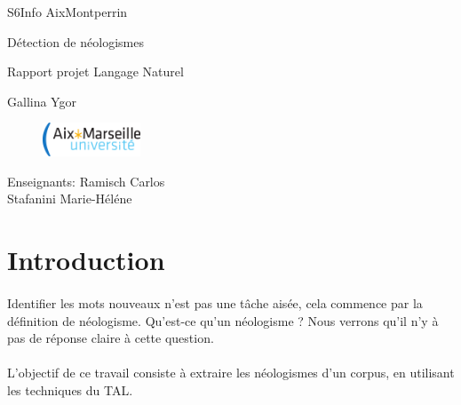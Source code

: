 \documentclass{article}
\begin{document}
\begin{flushleft}
S6Info AixMontperrin 
\end{flushleft}
\vspace*{150pt}
\begin{center}
{\Huge Détection de néologismes\par}
{\LARGE Rapport projet Langage Naturel\par\vspace*{20pt}}
{\Large Gallina Ygor\par\vspace*{20pt}}

\vspace{170pt}

\end{center}
\begin{figure}[htbp]
\begin{flushleft}
\includegraphics[height=1cm]{logo.eps}
\end{flushleft}
\end{figure}

\vspace*{-50pt}
\begin{flushright}
Enseignants: Ramisch Carlos\\Stafanini Marie-Héléne
\end{flushright}

\newpage

\section{Introduction}

\paragraph*{}
Identifier les mots nouveaux n'est pas une tâche aisée, cela commence par la définition de néologisme. Qu'est-ce qu'un néologisme ? Nous verrons qu'il n'y à pas de réponse claire à cette question.
\paragraph*{}
L'objectif de ce travail consiste à extraire les néologismes d'un corpus, en utilisant les techniques du TAL.
\end{document}
